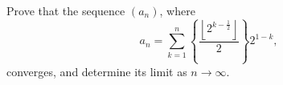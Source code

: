 Prove that the sequence $(a_n)$, where
$$a_n=\sum_{k=1}^n\left\{\frac{\left\lfloor2^{k-\frac12}\right\rfloor}2\right\}2^{1-k},$$converges, and determine its limit as $n\to\infty$.